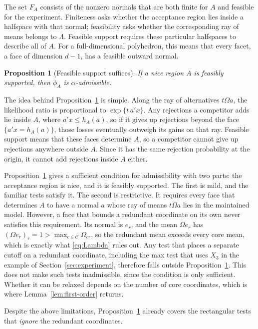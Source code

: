 \documentclass[11pt]{article}
\numberwithin{equation}{section}
\newtheorem{proposition}{Proposition}
\theoremstyle{definition}
\begin{document}
The set $F_A$ consists of the nonzero normals that are both finite for $A$ and feasible for the experiment. Finiteness asks whether the acceptance region lies inside a halfspace with that normal; feasibility asks whether the corresponding ray of means belongs to $\Lambda$. Feasible support requires these particular halfspaces to describe all of $A$. For a full-dimensional polyhedron, this means that every facet, a face of dimension $d-1$, has a feasible outward normal.

\begin{proposition}[Feasible support suffices]\label{prop:feasible-support}
If a nice region $A$ is feasibly supported, then $\phi_A$ is $\alpha$-admissible.
\end{proposition}

The idea behind Proposition~\ref{prop:feasible-support} is simple. Along the ray of alternatives $t\Omega a$, the likelihood ratio is proportional to $\exp\{t\,a'x\}$. Any rejections a competitor adds lie inside $A$, where $a'x\le h_A(a)$, so if it gives up rejections beyond the face $\{a'x=h_A(a)\}$, those losses eventually outweigh its gains on that ray. Feasible support means that these faces determine $A$, so a competitor cannot give up rejections anywhere outside $A$. Since it has the same rejection probability at the origin, it cannot add rejections inside $A$ either.

Proposition~\ref{prop:feasible-support} gives a sufficient condition for admissibility with two parts: the acceptance region is nice, and it is feasibly supported. The first is mild, and the familiar tests satisfy it. The second is restrictive. It requires every face that determines $A$ to have a normal $a$ whose ray of means $t\Omega a$ lies in the maintained model. However, a face that bounds a redundant coordinate on its own never satisfies this requirement. Its normal is $e_r$, and the mean $\Omega e_r$ has $(\Omega e_r)_r=1>\max_{c\in\mathcal C}\Omega_{cr}$, so the redundant mean exceeds every core mean, which is exactly what \eqref{eq:Lambda} rules out. Any test that places a separate cutoff on a redundant coordinate, including the max test that uses $X_3$ in the example of Section~\ref{sec:experiment}, therefore falls outside Proposition~\ref{prop:feasible-support}. This does not make such tests inadmissible, since the condition is only sufficient. Whether it can be relaxed depends on the number of core coordinates, which is where Lemma~\ref{lem:first-order} returns.

Despite the above limitations, Proposition~\ref{prop:feasible-support} already covers the rectangular tests that \emph{ignore} the redundant coordinates.
\end{document}
